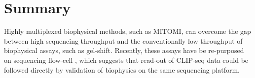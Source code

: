 \section{Summary}

Highly multiplexed biophysical methods, such as MITOMI, can overcome the gap between high sequencing throughput and the conventionally low throughput of biophysical assays, such as gel-shift. Recently, these assays have be re-purposed on sequencing flow-cell \cite{Buenrostro:2014kx}, which suggests that read-out of CLIP-seq data could be followed directly by validation of biophysics on the same sequencing platform.


 
 
 